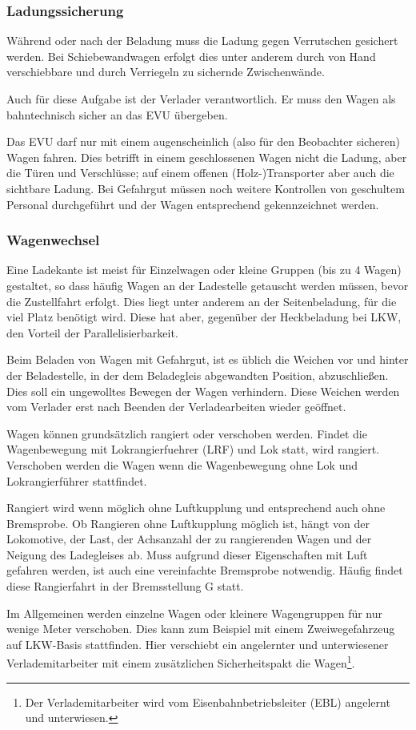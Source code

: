 \subsubsection{Ladungssicherung}
Während oder nach der Beladung muss die Ladung gegen Verrutschen gesichert werden. Bei Schiebewandwagen erfolgt dies unter anderem durch von Hand verschiebbare und durch Verriegeln zu sichernde Zwischenwände.\par
Auch für diese Aufgabe ist der Verlader verantwortlich. Er muss den Wagen als bahntechnisch sicher an das \acrshort{EVU} übergeben. \par
Das \acrshort{EVU} darf nur mit einem augenscheinlich (also für den Beobachter sicheren) Wagen fahren. Dies betrifft in einem geschlossenen Wagen nicht die Ladung, aber die Türen und Verschlüsse; auf einem offenen (Holz-)Transporter aber auch die sichtbare Ladung. Bei Gefahrgut müssen noch weitere Kontrollen von geschultem Personal durchgeführt und der Wagen entsprechend gekennzeichnet werden.
\subsubsection{Wagenwechsel}\label{sec:Wagenwechsel}
Eine Ladekante ist meist für Einzelwagen oder kleine Gruppen (bis zu 4 Wagen) gestaltet, so dass häufig Wagen an der Ladestelle getauscht werden müssen, bevor die Zustellfahrt erfolgt. Dies liegt unter anderem an der Seitenbeladung, für die viel Platz benötigt wird. Diese hat aber, gegenüber der Heckbeladung bei LKW, den Vorteil der Parallelisierbarkeit.%
\par
Beim Beladen von Wagen mit Gefahrgut, ist es üblich die Weichen vor und hinter der Beladestelle, in der dem Beladegleis abgewandten Position, abzuschließen. Dies soll ein ungewolltes Bewegen der Wagen verhindern. Diese Weichen werden vom Verlader erst nach Beenden der Verladearbeiten wieder geöffnet.\par
Wagen können grundsätzlich rangiert oder verschoben werden. Findet die Wagenbewegung mit \gls{Lokrangierfuehrer} (\acrshort{LRF}) und Lok statt, wird rangiert. Verschoben werden die Wagen wenn die Wagenbewegung ohne Lok und Lokrangierführer stattfindet.\par
Rangiert wird wenn möglich ohne Luftkupplung und entsprechend auch ohne \gls{Bremsprobe}. Ob Rangieren ohne Luftkupplung möglich ist, hängt von der Lokomotive, der Last, der Achsanzahl der zu rangierenden Wagen und der Neigung des Ladegleises ab. Muss aufgrund dieser Eigenschaften mit Luft gefahren werden, ist auch eine vereinfachte \gls{Bremsprobe} notwendig. Häufig findet diese Rangierfahrt in der Bremsstellung G statt.\par
Im Allgemeinen werden einzelne Wagen oder kleinere Wagengruppen für nur wenige Meter verschoben. Dies kann zum Beispiel mit einem Zweiwegefahrzeug auf LKW-Basis stattfinden. Hier verschiebt ein angelernter und unterwiesener Verlademitarbeiter mit einem zusätzlichen Sicherheitspakt die Wagen\footnote{Der Verlademitarbeiter wird vom \gls{Eisenbahnbetriebsleiter} (\acrshort{EBL}) angelernt und unterwiesen.}.
